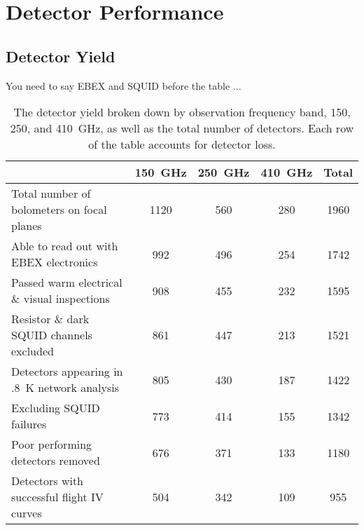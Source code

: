 \chapter{Detector Performance}
\label{detector_performance_chapter}

\section{Detector Yield}
\label{sec:yield}


You need to say \ac{EBEX} and \ac{SQUID} before the table ...

\begin{table}[ht!]
\begin{center}
\begin{tabular}{l|c|c|c|c}
  & 150~GHz & 250~GHz & 410~GHz & Total \\
\hline Total number of bolometers on focal planes & 1120 & 560 & 280 & 1960 \\
\hline Able to read out with \ac{EBEX} electronics & 992 & 496 & 254 & 1742 \\
\hline Passed warm electrical \& visual inspections & 908 & 455 & 232 & 1595 \\
\hline Resistor \& dark \ac{SQUID} channels excluded & 861 & 447 & 213 & 1521 \\
\hline Detectors appearing in .8~K network analysis & 805 & 430 & 187 & 1422 \\
\hline Excluding SQUID failures & 773 & 414 & 155 & 1342 \\
\hline Poor performing detectors removed & 676 & 371 & 133 & 1180 \\
\hline Detectors with successful flight IV curves & 504 & 342 & 109 & 955 \\
\hline
\end{tabular}
\end{center}
\caption{The detector yield broken down by observation frequency band, 150, 250, and 410~GHz, as well as the total number of detectors. Each row of the table accounts for detector loss.}
\label{yield_table}
\end{table}

